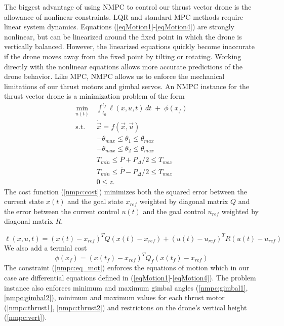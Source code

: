 \documentclass[]{article}
\newcommand{\mpc}{MPC}
\newcommand{\nmpc}{NMPC}
\newcommand{\pdiff}{P_{\Delta}}
\newcommand{\pavg}{\overline{P}}
\begin{document}
The biggest advantage of using {\nmpc} to control our thrust vector drone is the allowance of nonlinear constraints. LQR and standard {\mpc} methods  require linear system dynamics.
 Equations (\ref{eqMotion1}-\ref{eqMotion4}) are strongly nonlinear, but can be linearized around the fixed point in which the drone is vertically balanced.  However, the linearized equations quickly become inaccurate if the drone moves away from the fixed point by tilting or rotating.  Working directly with the nonlinear equations allows more accurate predictions of the drone behavior. Like {\mpc}, {\nmpc}  allows us to enforce the mechanical limitations of our thrust motors and gimbal servos. An {\nmpc} instance for the thrust vector drone is a minimization problem of the form
\begin{align}
	   \min_{u(t)} \; & \int_{t_0}^{t_f} \ell(x,u,t)\,dt \;+\; \phi(x_f) \label{nmpc:cost} \\
	  	  \text{s.t.} \;\; & \dot{\vec{x}} = f(\vec{x},\vec{u})  \label{nmpc:eq_mot} \\
	  &	-\theta_{max} \leq \theta_1 \leq \theta_{max} \label{nmpc:gimbal1} \\
	  & 	-\theta_{max} \leq \theta_2 \leq \theta_{max} \label{nmpc:gimbal2} \\
	  & 	T_{min}  \leq \pavg + \pdiff/2 \leq T_{max} \label{nmpc:thrust1} \\
	  &    T_{min} \leq  \pavg - \pdiff/2 \leq T_{max} \label{nmpc:thrust2} \\
	  &        0 \leq z. \label{nmpc:vert}
\end{align}
The cost function (\ref{nmpc:cost}) minimizes both  the squared error between the current state $x(t)$ and the goal state $x_{ref}$ weighted by diagonal matrix $Q$ and the error between the current control $u(t)$ and the goal control $u_{ref}$ weighted by diagonal matrix $R$. 
        
        \begin{equation*}
        		\ell(x,u,t) = (x(t)-x_{ref})^T Q (x(t)-x_{ref}) + (u(t)-u_{ref})^T R (u(t)-u_{ref}) 
        \end{equation*}
We also add a termial cost 
        \begin{equation*}
        	\phi(x_f) = (x(t_f)-x_{ref})^T Q_f (x(t_f)-x_{ref})
        \end{equation*}
The constraint (\ref{nmpc:eq_mot}) enforces the equations of motion which in our case are differential equations defined in (\ref{eqMotion1}-\ref{eqMotion4}). The problem instance also enforces minimum and maximum gimbal angles (\ref{nmpc:gimbal1},\ref{nmpc:gimbal2}), minimum and maximum values for each thrust motor (\ref{nmpc:thrust1}, \ref{nmpc:thrust2}) and restrictons on the drone's vertical height (\ref{nmpc:vert}).
\end{document}
